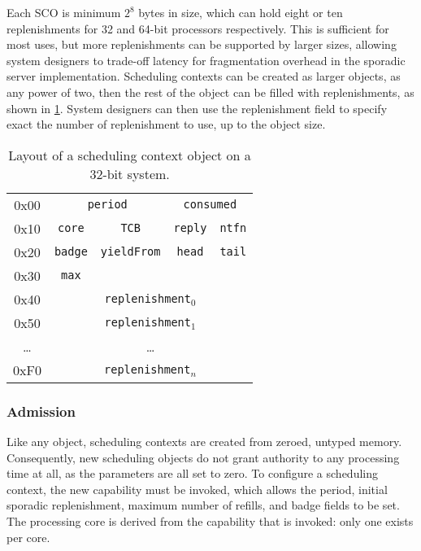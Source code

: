 Each \gls{SCO} is minimum $2^{8}$ bytes in size, which can hold eight or ten replenishments for 32
and 64-bit processors respectively. This is sufficient for most uses, but more replenishments can
be supported by larger sizes, allowing system designers to trade-off latency for fragmentation
overhead in the sporadic server implementation. Scheduling contexts can be created as larger
objects, as any power of two, then the rest of the object can be filled with replenishments, as
shown in \cref{t:impl-sc-layout}. System designers can then use the  replenishment field
to specify exact the number of replenishment to use, up to the object size. 

\begin{table}[t] 
    \centering
    \begin{tabular}{c|c|c|c|c|}\cline{2-5}
        0x00 &  \multicolumn{2}{c}{\texttt{period}} & \multicolumn{2}{|c|}{\texttt{consumed}}
        \\\cline{2-5}
        0x10 & \texttt{core}                         & \texttt{TCB} & \texttt{reply} & \texttt{ntfn} \\\cline{2-5}
        0x20 &\texttt{badge}                        & \texttt{yieldFrom}                               & \texttt{head}  & \texttt{tail} \\\cline{2-5}
        0x30 & \texttt{max}                          &                                                  &                & \\\cline{2-5}
        0x40 & \multicolumn{4}{c|}{\texttt{replenishment$_{0}$}}  \\\cline{2-5}
        0x50 & \multicolumn{4}{c|}{\texttt{replenishment$_{1}$}}  \\\cline{2-5}
        \ldots & \multicolumn{4}{c|}{\ldots}  \\\cline{2-5}
        0xF0 & \multicolumn{4}{c|}{\texttt{replenishment$_{n}$}}  \\\cline{2-5}


    \end{tabular}
    \caption{Layout of a scheduling context object on a 32-bit system.}
    \label{t:impl-sc-layout}
\end{table}

\subsubsection{Admission}

Like any \selfour object, scheduling contexts are created from zeroed, untyped memory. Consequently,
new scheduling objects do not grant authority to any processing time at all, as the parameters are
all set to zero. To configure a scheduling context, the new  capability must be
invoked, which allows the period, initial sporadic replenishment, maximum number of refills, and
badge fields to be set. The processing core is derived from the  capability
that is invoked: only one exists per core. 

